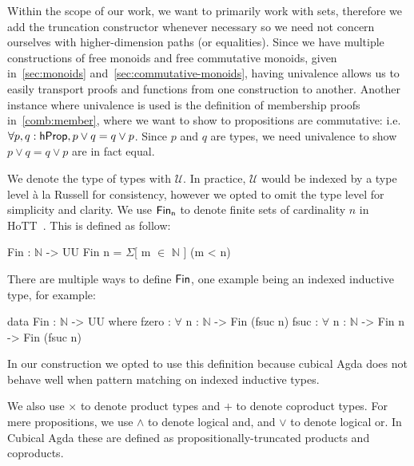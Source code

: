 \begin{toappendix}
Within the scope of our work, we want to primarily work with
sets, therefore we add the truncation constructor whenever necessary so we need not concern ourselves
with higher-dimension paths (or equalities). Since we have multiple constructions of free monoids
and free commutative monoids, given in~\cref{sec:monoids} and~\cref{sec:commutative-monoids},
having univalence allows us to easily transport proofs and functions from one construction to another.
Another instance where univalence is used is the definition of membership proofs in~\cref{comb:member},
where we want to show to propositions are commutative: i.e. $\forall p, q: \mathsf{hProp}, p \vee q = q \vee p$.
Since $p$ and $q$ are types, we need univalence to show $p \vee q = q \vee p$ are in fact equal.
\end{toappendix}

We denote the type of types with $\mathcal{U}$. 
In practice, $\mathcal{U}$ would be indexed by a type level 
à la Russell for consistency, however we opted to omit the type level
for simplicity and clarity.
We use $\Fin[n]$ to denote finite sets of cardinality $n$ in HoTT~\cite{yorgeyCombinatorialSpeciesLabelled2014a}.
This is defined as follow:
\vspace{-1em}
\begin{code}
Fin : $\mathbb{N}$ -> UU
Fin n = $\Sigma$[ m $\in$ $\mathbb{N}$ ] (m < n)
\end{code}

\noindent
There are multiple ways to define $\Fin$, one example being an indexed inductive type,
for example:
\vspace{-1em}
\begin{code}
data Fin : $\mathbb{N}$ -> UU where
    fzero : $\forall$ {n : $\mathbb{N}$} -> Fin (fsuc n)
    fsuc  : $\forall$ {n : $\mathbb{N}$} -> Fin n -> Fin (fsuc n)
\end{code}
In our construction we opted to use this definition because cubical Agda does not behave well
when pattern matching on indexed inductive types.

We also use $\times$ to denote product types and $+$ to denote coproduct types.
For mere propositions, we use $\land$ to denote logical and, and $\vee$ to denote logical or.
In Cubical Agda these are defined as propositionally-truncated products and coproducts.
